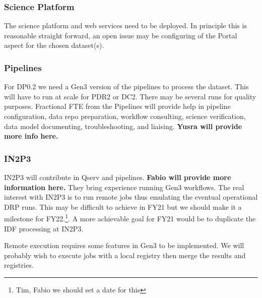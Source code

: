 \subsubsection{ Science Platform}
The science platform and web services need to be deployed. In principle this is reasonable straight forward, an open issue may be configuring of the Portal aspect for the chosen  dataset(s).

\subsubsection{ Pipelines }
For DP0.2 we need a Gen3 version of the pipelines to process the dataset. This will have to run at scale for PDR2 or DC2. There may be several runs for quality purposes.
Fractional FTE from the Pipelines will provide help in pipeline configuration, data repo preparation, workflow consulting, science verification, data model documenting, troubleshooting, and liaising.
{\bf Yusra will provide more info here.}

\subsubsection{ IN2P3}\label{sec:in2p3}
IN2P3 will contribute in Qserv and pipelines. {\bf Fabio will provide more information here.}
They bring experience running Gen3 workflows. The real interest with IN2P3 is to run remote jobs thus emulating the eventual operational DRP runs. This may be difficult to achieve in FY21 but we should make it a milestone for FY22.\footnote{Tim, Fabio we should set a date for this}. A more achievable goal for FY21 would be to duplicate the IDF processing at IN2P3.

Remote execution requires some  features in Gen3 to be implemented. We will probably wish to execute jobs with a local registry then merge the results and registries.
